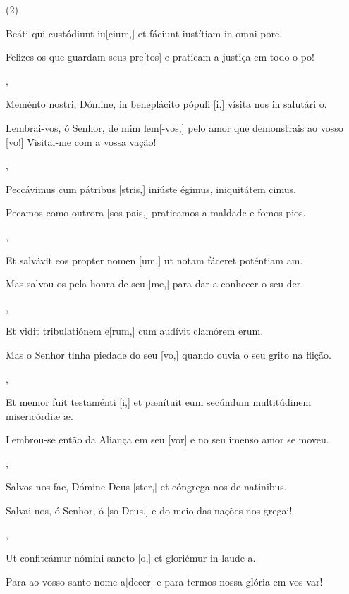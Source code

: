 \SetVersePairs(2){
    {\item {}Beáti qui custódiunt iu[cium,] et fáciunt iustítiam in omni pore.~\Responsorium}%
        {\item {}Felizes os que guardam seus pre[tos] e praticam a justiça em todo o po!~\Responsorium},
    {\item {}Meménto nostri, Dómine, in beneplácito pópuli [i,] vísita nos in salutári o.~\Responsorium}%
        {\item {}Lembrai-vos, ó Senhor, de mim lem[-vos,] pelo amor que demonstrais ao vosso [vo!] Visitai-me com a vossa vação!~\Responsorium},
    {\item {}Peccávimus cum pátribus [stris,] iniúste égimus, iniquitátem cimus.~\Responsorium}%
        {\item {}Pecamos como outrora [sos pais,] praticamos a maldade e fomos pios.~\Responsorium},
    {\item {}Et salvávit eos propter nomen [um,] ut notam fáceret poténtiam am.~\Responsorium}%
        {\item {}Mas salvou-os pela honra de seu [me,] para dar a conhecer o seu der.~\Responsorium},
    {\item {}Et vidit tribulatiónem e[rum,] cum audívit clamórem erum.~\Responsorium}%
        {\item {}Mas o Senhor tinha piedade do seu [vo,] quando ouvia o seu grito na flição.~\Responsorium},
    {\item {}Et memor fuit testaménti [i,] et pænítuit eum secúndum multitúdinem misericórdiæ æ.~\Responsorium}%
        {\item {}Lembrou-se então da Aliança em seu [vor] e no seu imenso amor se moveu.~\Responsorium},
    {\item {}Salvos nos fac, Dómine Deus [ster,] et cóngrega nos de natinibus.~\Responsorium}%
        {\item {}Salvai-nos, ó Senhor, ó [so Deus,] e do meio das nações nos gregai!~\Responsorium},
    {\item {}Ut confiteámur nómini sancto [o,] et gloriémur in laude a.~\Responsorium}%
        {\item {}Para ao vosso santo nome a[decer] e para termos nossa glória em vos var!~\Responsorium}
}